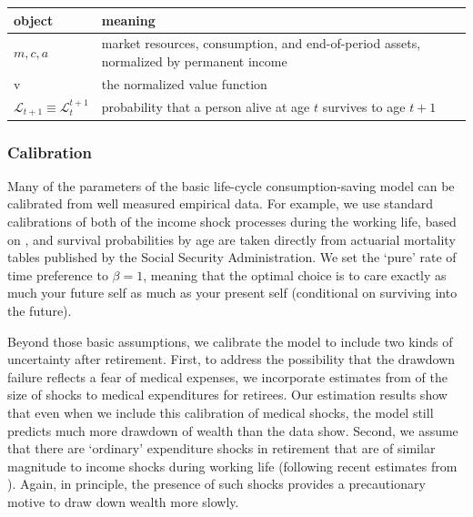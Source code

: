 \documentclass{article}
\newcommand{\vFunc}{\mathrm{v}}
\newcommand{\Alive}{\mathcal{L}}
\newcommand{\cNrm}{c}
\newcommand{\aNrm}{a}
\newcommand{\mNrm}{m}
\begin{document}
\bigskip\noindent
\begin{tabular}{p{}p{}}
\toprule
object & meaning \\
\hline
$\mNrm, \cNrm, \aNrm$ & market resources, consumption, and end-of-period assets, normalized by permanent income \\
$\vFunc$ & the normalized value function \\
$\Alive_{t+1} \equiv \Alive_{t}^{t+1}$ & probability that a person alive at age $t$ survives to age $t+1$ \\
\bottomrule
\end{tabular}

\bigskip

\subsubsection{Calibration}

Many of the parameters of the basic life-cycle consumption-saving model can be calibrated from well measured empirical data.
For example, we use standard calibrations of both of the income shock processes during the working life, based on \cite{Cagetti2003}, and
survival probabilities by age are taken directly from actuarial mortality tables published by the Social Security Administration.
We set the `pure' rate of time preference to $\beta=1$, meaning that the optimal choice is to care exactly as much your future self as much as your present self (conditional on surviving into the future).

Beyond those basic assumptions, we calibrate the model to include two kinds of uncertainty after retirement.
First, to address the possibility that the drawdown failure reflects a fear of medical expenses, we incorporate estimates from \cite{velasquezgiraldoJMP} of the size of shocks to medical expenditures for retirees.
Our estimation results show that even when we include this calibration of medical shocks, the model still predicts much more drawdown of wealth than the data show.
Second, we assume that there are `ordinary' expenditure shocks in retirement that are of similar magnitude to income shocks during working life (following recent estimates from  \cite{flExpShocks}).
Again, in principle, the presence of such shocks provides a precautionary motive to draw down wealth more slowly.
\end{document}
